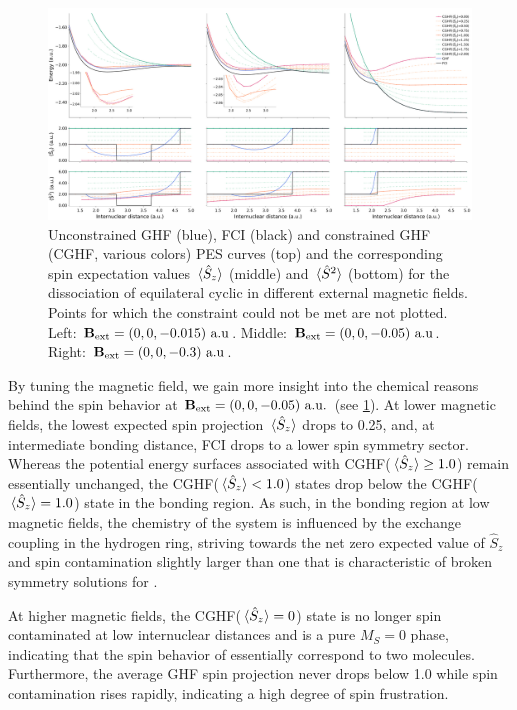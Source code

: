 \documentclass[journal=jctc,manuscript=article]{achemso}
\begin{document}
        \begin{figure}
            \includegraphics[width=\textwidth]{C-GHF-PES(H4)}
            \caption{
                Unconstrained GHF (blue), FCI (black) and constrained GHF (CGHF, various colors) PES curves (top) and the corresponding spin expectation values $\ev*{\hat{S}_z}$ (middle) and $\ev*{\hat{S}^2}$ (bottom) for the dissociation of equilateral cyclic  in different external magnetic fields.
                Points for which the constraint could not be met are not plotted.    
                Left: $\vb{B}_{\text{ext}} = (0,0,-0.015)\text{ a.u}$.
                Middle: $\vb{B}_{\text{ext}} = (0,0,-0.05)\text{ a.u}$.
                Right: $\vb{B}_{\text{ext}} = (0,0,-0.3)\text{ a.u}$.
            }
            \label{fig:C-GHF-PES(H4)}
        \end{figure}

        By tuning the magnetic field, we gain more insight into the chemical reasons behind the spin behavior at $\vb{B}_{\text{ext}} = (0,0,-0.05)\text{ a.u.}$ (see \cref{fig:C-GHF-PES(H4)}). 
        At lower magnetic fields, the lowest expected spin projection $\ev*{\hat{S}_z}$ drops to 0.25, and, at intermediate bonding distance, FCI drops to a lower spin symmetry sector.
        Whereas the potential energy surfaces associated with CGHF($\ev*{\hat{S}_z} \geq 1.0$) remain essentially unchanged, the CGHF($\ev*{\hat{S}_z} <  1.0$) states drop below the CGHF($\ev*{\hat{S}_z}=1.0$) state in the bonding region.
        As such, in the bonding region at low magnetic fields, the chemistry of the system is influenced by the exchange coupling in the hydrogen ring, striving towards the net zero expected value of $\hat{S}_z$ and spin contamination slightly larger than one that is characteristic of broken symmetry solutions for  \cite{Goings.2015}.

        At higher magnetic fields, the CGHF($\ev*{\hat{S}_z}=0$) state is no longer spin contaminated at low internuclear distances and is a pure $M_S=0$ phase, indicating that the spin behavior of  essentially correspond to two  molecules.
        Furthermore, the average GHF spin projection never drops below 1.0 while spin contamination rises rapidly, indicating a high degree of spin frustration.
\end{document}
